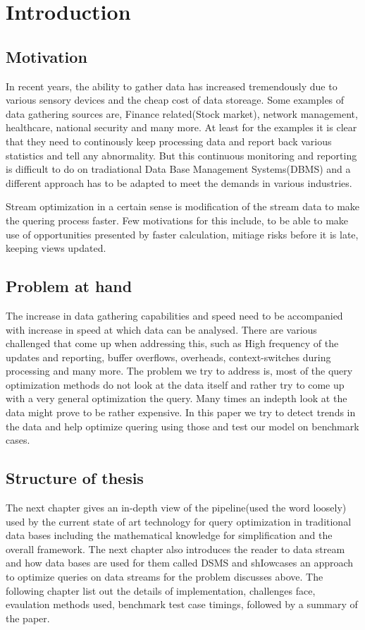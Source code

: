\chapter{Introduction}
\label{chapter:Introduction}
\thispagestyle{myheadings}

\section{Motivation}
\label{sec:Motivation}
In recent years, the ability to gather data has increased tremendously due to various sensory devices and the cheap cost of data storeage. Some examples of data gathering sources are, Finance related(Stock market), network management, healthcare, national security and many more. At least for the examples it is clear that they need to continously keep processing data and report back various statistics and tell any abnormality. But this continuous monitoring and reporting is difficult to do on tradiational Data Base Management Systems(DBMS) and a different approach has to be adapted to meet the demands in various industries. 
\par Stream optimization in a certain sense is modification of the stream data to make the quering process faster. Few motivations for this include, to be able to make use of opportunities presented by faster calculation, mitiage risks before it is late, keeping views updated.

\section{Problem at hand}
\label{sec:Problem at hand}
\par The increase in data gathering capabilities and speed need to be accompanied with increase in speed at which data can be analysed. There are various challenged that come up when addressing this, such as High frequency of the updates and reporting, buffer overflows, overheads, context-switches during processing and many more. The problem we try to address is, most of the query optimization methods do not look at the data itself and rather try to come up with a very general optimization the query. Many times an indepth look at the data might prove to be rather expensive. In this paper we try to detect trends in the data and help optimize quering using those and test our model on benchmark cases.


\section{Structure of thesis}
\label{sec:Structure of thesis}
The next chapter gives an in-depth view of the pipeline(used the word loosely) used by the current state of art technology for query optimization in traditional data bases including the mathematical knowledge for simplification and the overall framework. The next chapter also introduces the reader to data stream and how data bases are used for them called DSMS and shIowcases an approach to optimize queries on data streams for the problem discusses above. The following chapter list out the details of implementation, challenges face, evaulation methods used, benchmark test case timings, followed by a summary of the paper.

